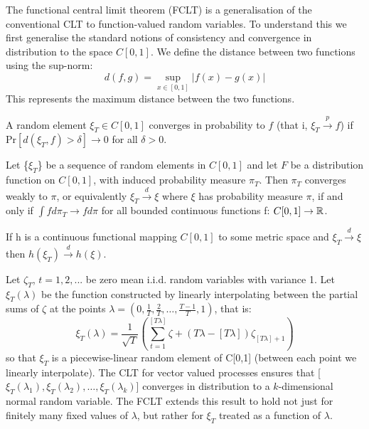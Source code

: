\documentclass[DIV=14,titlepage=false]{scrreprt}
\begin{document}
The functional central limit theorem (FCLT) is a generalisation of the conventional CLT to function-valued random variables. To understand this we first generalise the standard notions of consistency and convergence in distribution to the space $C[0,1]$. We define the distance between two functions using the sup-norm:
\[
    d(f,g) = \sup_{x \in [0,1]} |f(x) - g(x)|
\]
This represents the maximum distance between the two functions.\\
\begin{definition}
    A random element $\xi_T \in C[0,1]$ converges in probability to $f$ (that i, $\xi_T \xrightarrow{p} f$) if Pr$[d(\xi_T, f) > \delta] \to 0$ for all $\delta > 0$.
\end{definition}

\begin{definition}
Let \{$\xi_T$\} be a sequence of random elements in $C[0,1]$ and let $F$ be a distribution function on $C[0,1]$, with induced probability measure $\pi_T$. Then $\pi_T$ converges weakly to $\pi$, or equivalently $\xi_T \xrightarrow{d} \xi$ where $\xi$ has probability measure $\pi$, if and only if $\int f d \pi_T \to f d \pi$ for all bounded continuous functions f: $C[0,1] \to \mathbb{R}$.
\end{definition}

\begin{definition}
    If h is a continuous functional mapping $C[0,1]$ to some metric space and $\xi_T \xrightarrow{d} \xi$ then $h(\xi_T) \xrightarrow{d} h(\xi)$.
\end{definition}

Let $\zeta_T$, $t=1,2,...$ be zero mean i.i.d. random variables with variance 1. Let $\xi_T(\lambda)$ be the function constructed by linearly interpolating between the partial sums of $\zeta$ at the points $\lambda = (0, \frac{1}{T}, \frac{2}{T}, \dots, \frac{T-1}{T}, 1)$, that is:
\[
    \xi_T(\lambda) = \frac{1}{\sqrt{T}}\left(\sum_{t=1}^{[T\lambda]} \zeta + (T\lambda - [T\lambda])\zeta_{[T\lambda]+1}\right)
\]
so that $\xi_T$ is a piecewise-linear random element of C[0,1] (between each point we linearly interpolate). The CLT for vector valued processes ensures that [$\xi_T(\lambda_1), \xi_T(\lambda_2), \dots, \xi_T(\lambda_k)$] converges in distribution to a $k$-dimensional normal random variable. The FCLT extends this result to hold not just for finitely many fixed values of $\lambda$, but rather for $\xi_T$ treated as a function of $\lambda$.
\end{document}
